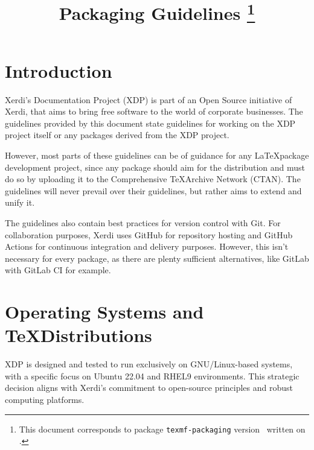 \documentclass{xdpdoc}
\title{Packaging Guidelines%
\thanks{This document corresponds to package \texttt{texmf-packaging} version \gitversion\ written on \gitdate.}%
}
\begin{document}
    \maketitle

    \begin{multicols}{2}
        \section*{Introduction}
        Xerdi's Documentation Project (XDP) is part of an Open Source initiative of Xerdi, that aims to bring free software to the world of corporate businesses.
        The guidelines provided by this document state guidelines for working on the XDP project itself or any packages derived from the XDP project.

        However, most parts of these guidelines can be of guidance for any \LaTeX package development project, since any package should aim for the \TeXLive distribution and must do so by uploading it to the Comprehensive \TeX Archive Network (CTAN).
        The guidelines will never prevail over their guidelines, but rather aims to extend and unify it.

        The guidelines also contain best practices for version control with Git.
        For collaboration purposes, Xerdi uses GitHub for repository hosting and GitHub Actions for continuous integration and delivery purposes.
        However, this isn't necessary for every package, as there are plenty sufficient alternatives, like GitLab with GitLab CI for example.


        \section{Operating Systems and \TeX Distributions}
        XDP is designed and tested to run exclusively on GNU/Linux-based systems, with a specific focus on Ubuntu 22.04 and RHEL9 environments.
        This strategic decision aligns with Xerdi's commitment to open-source principles and robust computing platforms.


\end{multicols}
\end{document}
